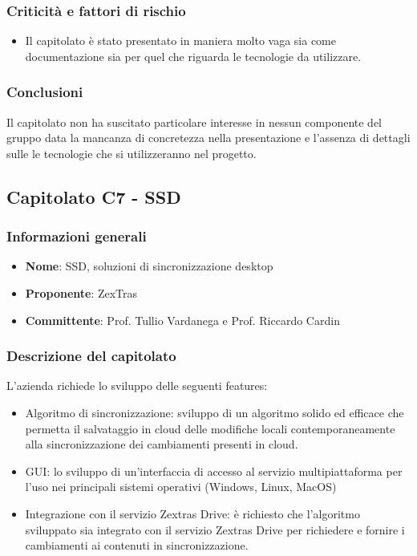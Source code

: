 		\subsubsection{Criticità e fattori di rischio}
			\begin{itemize}
				\item Il capitolato è stato presentato in maniera molto vaga sia come documentazione sia per quel che riguarda le tecnologie da utilizzare.
			\end{itemize}
		\subsubsection{Conclusioni}
			Il capitolato non ha suscitato particolare interesse in nessun componente del gruppo data la mancanza di concretezza nella presentazione e l’assenza di dettagli sulle le tecnologie che si utilizzeranno nel progetto.
\newpage
				
					
	\subsection{Capitolato C7 - SSD}
		\subsubsection{Informazioni generali}
			\begin{itemize}
				\item\textbf{Nome}: SSD, soluzioni di sincronizzazione desktop
				\item\textbf{Proponente}: ZexTras
				\item\textbf{Committente}: Prof. Tullio Vardanega e Prof. Riccardo Cardin
			\end{itemize}
			
		\subsubsection{Descrizione del capitolato}
			L’azienda richiede lo sviluppo delle seguenti features:
			\begin{itemize}
				\item Algoritmo di sincronizzazione: sviluppo di un algoritmo solido ed efficace che permetta il salvataggio in cloud delle modifiche locali contemporaneamente alla sincronizzazione  dei cambiamenti presenti in cloud.
				\item GUI: lo sviluppo di un’interfaccia di accesso al servizio multipiattaforma per l’uso nei principali sistemi operativi (Windows, Linux, MacOS)
				\item Integrazione con il servizio Zextras Drive: è richiesto che l’algoritmo sviluppato sia integrato con il servizio Zextras Drive per richiedere e fornire i cambiamenti ai contenuti in sincronizzazione.
			\end{itemize}
